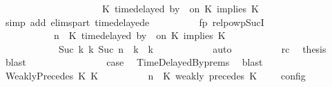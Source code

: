 \begin{isabellebody}
\ \ \ \ \ \ \ \ \ \ \ \ \ \ \ \ \ \ {\isasymturnstile}\ {\isasymPsi}\ {\isasymtriangleright}\ {\isacharparenleft}{\isacharparenleft}K\ time{\isacharminus}delayed\ by\ {\isasymdelta}{\isasymtau}\ on\ K\ implies\ K\ {\isacharhash}\ {\isasymPhi}{\isacharparenright}{\isacharparenright}{\isacartoucheclose}\isanewline
\ \ \ \ \ \ \ \ \ \ \isamarkupfalse%
\ {\isacharparenleft}simp\ add{\isacharcolon}\ elims{\isacharunderscore}part\ timedelayed{\isacharunderscore}e{}{\isacharparenright}\isanewline
\ \ \ \ \ \ \ \ \isamarkupfalse%
\ fp\ relpowp{\isacharunderscore}Suc{\isacharunderscore}I{}\ \isamarkupfalse%
\isanewline
\ \ \ \ \ \ \ \ \ \ {\isacartoucheopen}{\isacharparenleft}{\isasymGamma}{\isacharcomma}\ n\ {\isasymturnstile}\ {\isacharparenleft}{\isacharparenleft}K\ time{\isacharminus}delayed\ by\ {\isasymdelta}{\isasymtau}\ on\ K\ implies\ K\ {\isacharhash}\ {\isasymPsi}{\isacharparenright}\ {\isasymtriangleright}\ {\isasymPhi}{\isacharparenright}\isanewline
\ \ \ \ \ \ \ \ \ \ \ \ {\isasymhookrightarrow}\isactrlbsup Suc\ k\isactrlesup \ {\isacharparenleft}{\isasymGamma}\isactrlsub k{\isacharcomma}\ Suc\ n\ {\isasymturnstile}\ {\isasymPsi}\isactrlsub k\ {\isasymtriangleright}\ {\isasymPhi}\isactrlsub k{\isacharparenright}{\isacartoucheclose}\isanewline
\ \ \ \ \ \ \ \ \ \ \isamarkupfalse%
\ auto\isanewline
\ \ \ \ \ \ \ \ \isamarkupfalse%
\ rc\ \isamarkupfalse%
\ {\isacharquery}thesis\ \isamarkupfalse%
\ blast\isanewline
\ \ \ \ \ \ \isamarkupfalse%
\isanewline
\ \ \ \ \ \ \isamarkupfalse%
\ \isamarkupfalse%
\ {\isacharquery}case\ \isamarkupfalse%
\ TimeDelayedBy{\isachardot}prems{\isacharparenleft}{}{\isacharparenright}\ \isamarkupfalse%
\ blast\isanewline
\ \ \isamarkupfalse%
\isanewline
\ \ \ \ \isamarkupfalse%
\ {\isacharparenleft}WeaklyPrecedes\ K\ K\isanewline
\ \ \ \ \ \ \isamarkupfalse%
\ {\isacartoucheopen}{\isasymlbrakk}\ {\isasymGamma}{\isacharcomma}\ n\ {\isasymturnstile}\ {\isacharparenleft}{\isacharparenleft}K\ weakly\ precedes\ K\ {\isacharhash}\ {\isasymPsi}{\isacharparenright}\ {\isasymtriangleright}\ {\isasymPhi}\ {\isasymrbrakk}\isactrlsub c\isactrlsub o\isactrlsub n\isactrlsub f\isactrlsub i\isactrlsub g\ {\isacharequal}\isanewline

\end{isabellebody}
